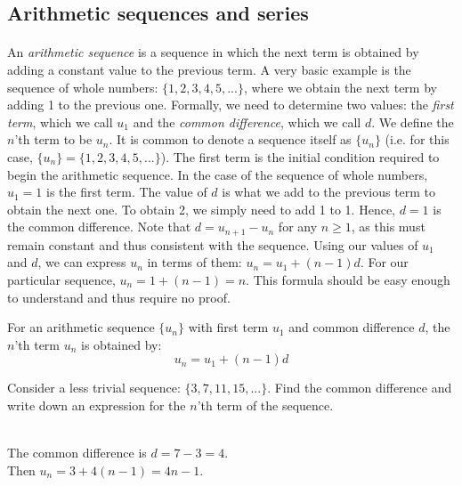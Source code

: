 \documentclass[12pt, a4paper, titlepage, twoside]{article}
\newcounter{excount}[subsection]
\begin{document}
	\subsection{Arithmetic sequences and series}
	
	\paragraph{}
	An \textit{arithmetic sequence} is a sequence in which the next term is obtained by adding a constant value to the previous term.
	A very basic example is the sequence of whole numbers: $\{1,2,3,4,5,...\}$, where we obtain the next term by adding 1 to the
	previous one. Formally, we need to determine two values: the \textit{first term}, which we call $u_1$ and the \textit{common 
	difference}, which we call $d$. We define the $n$'th term to be $u_n$. It is common to denote a sequence itself as $\{u_n\}$
	(i.e. for this case, $\{u_n\} = \{1,2,3,4,5,...\}$).
	The first term is the initial condition required to begin the
	arithmetic sequence. In the case of the sequence of whole numbers, $u_1 = 1$ is the first term. The value of $d$ is what we
	add to the previous term to obtain the next one. To obtain 2, we simply need to add 1 to 1. Hence, $d=1$ is the common difference.
	Note that $d = u_{n+1} - u_n$ for any $n \geqslant 1$, as this must remain constant and thus consistent with the sequence.
	Using our values of $u_1$ and $d$, we can express $u_n$ in terms of them: $u_n = u_1 + (n-1)d$. For our particular sequence,
	$u_n = 1 + (n-1) = n$. This formula should be easy enough to understand and thus require no proof.\\
	
	\begin{kp}
		For an arithmetic sequence $\{u_n\}$ with first term $u_1$ and common difference $d$, the $n$'th term $u_n$ is obtained by:	
		$$u_n = u_1 + (n-1)d$$
	\end{kp}
	
	\hfill
	
	\begin{ex}
		Consider a less trivial sequence: $\{3, 7, 11, 15,...\}$. Find the common difference and write down an expression for the
		$n$'th term of the sequence.\\
		
		\tcbline
		
		\hfill \\
		The common difference is $d = 7 - 3 = 4$. \\Then $u_n = 3 + 4(n-1) = 4n - 1$.		
	\end{ex}
	
\end{document}

